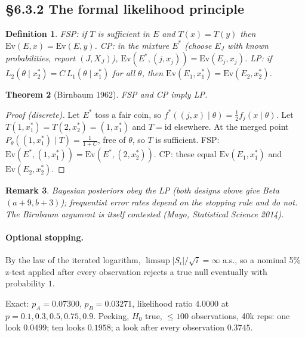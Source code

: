 \documentclass[11pt]{article}
\newtheorem{theorem}{Theorem}[section]
\newtheorem{definition}[theorem]{Definition}
\newtheorem{remark}[theorem]{Remark}
\begin{document}
\subsection{\S6.3.2 The formal likelihood principle}
\begin{definition}
\emph{FSP}: if $T$ is sufficient in $E$ and $T(x)=T(y)$ then $\mathrm{Ev}(E,x)=\mathrm{Ev}(E,y)$. \emph{CP}: in the mixture $E^*$ (choose $E_J$ with known probabilities, report $(J,X_J)$), $\mathrm{Ev}(E^*,(j,x_j))=\mathrm{Ev}(E_j,x_j)$. \emph{LP}: if $L_2(\theta\mid x_2^*)=C\,L_1(\theta\mid x_1^*)$ for all $\theta$, then $\mathrm{Ev}(E_1,x_1^*)=\mathrm{Ev}(E_2,x_2^*)$.
\end{definition}
\begin{theorem}[Birnbaum 1962]
FSP and CP imply LP.
\end{theorem}
\begin{proof}[Proof (discrete)]
Let $E^*$ toss a fair coin, so $f^*((j,x)\mid\theta)=\frac12f_j(x\mid\theta)$. Let $T(1,x_1^*)=T(2,x_2^*)=(1,x_1^*)$ and $T=\mathrm{id}$ elsewhere. At the merged point $P_\theta((1,x_1^*)\mid T)=\frac{1}{1+C}$, free of $\theta$, so $T$ is sufficient. FSP: $\mathrm{Ev}(E^*,(1,x_1^*))=\mathrm{Ev}(E^*,(2,x_2^*))$. CP: these equal $\mathrm{Ev}(E_1,x_1^*)$ and $\mathrm{Ev}(E_2,x_2^*)$.
\end{proof}
\begin{remark}
Bayesian posteriors obey the LP (both designs above give Beta$(a+9,b+3)$); frequentist error rates depend on the stopping rule and do not. The Birnbaum argument is itself contested (Mayo, \emph{Statistical Science} 2014).
\end{remark}
\paragraph{Optional stopping.} By the law of the iterated logarithm, $\limsup|S_i|/\sqrt i=\infty$ a.s., so a nominal 5\% z-test applied after every observation rejects a true null eventually with probability $1$.
\begin{simbox}
Exact: $p_A=0.07300$, $p_B=0.03271$, likelihood ratio $4.0000$ at $p=0.1,0.3,0.5,0.75,0.9$. Peeking, $H_0$ true, $\le100$ observations, 40k reps: one look $0.0499$; ten looks $0.1958$; a look after every observation $0.3745$.
\end{simbox}
\end{document}
